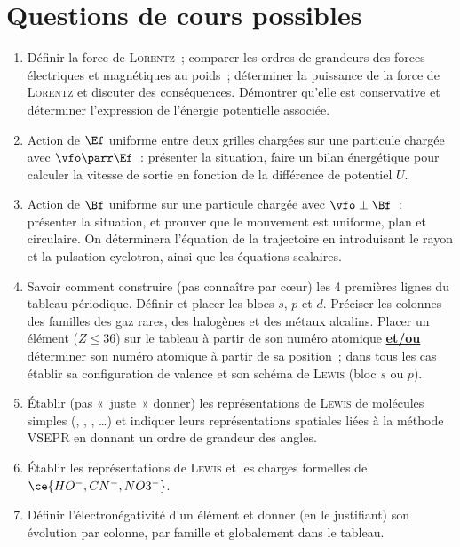 \documentclass[a4paper, 12pt, final, garamond]{book}
\begin{document}
\section{Questions de cours possibles}
\begin{enumerate}[label=\sqenumi]
    \item Définir la force de \textsc{Lorentz}~; comparer les ordres de
        grandeurs des forces électriques et magnétiques au poids~; déterminer la
        puissance de la force de \textsc{Lorentz} et discuter des conséquences.
        Démontrer qu'elle est conservative et déterminer l'expression de
        l'énergie potentielle associée.
    \item Action de $\Ef$ uniforme entre deux grilles chargées sur une particule
        chargée avec $\vfo\parr\Ef$~: présenter la situation, faire un bilan
        énergétique pour calculer la vitesse de sortie en fonction de la
        différence de potentiel $U$.
    \item Action de $\Bf$ uniforme sur une particule chargée avec
        $\vfo\perp\Bf$~: présenter la situation, et prouver que le mouvement est
        uniforme, plan et circulaire. On déterminera l'équation de la
        trajectoire en introduisant le rayon et la pulsation cyclotron, ainsi
        que les équations scalaires.
    \item Savoir comment construire (pas connaître par cœur) les 4 premières
        lignes du tableau périodique. Définir et placer les blocs $s$, $p$ et
        $d$. Préciser les colonnes des familles des gaz rares, des halogènes et
        des métaux alcalins. Placer un élément ($Z \leq 36$) sur le tableau à
        partir de son numéro atomique \textbf{\ul{et/ou}} déterminer son numéro
        atomique à partir de sa position~; dans tous les cas établir sa
        configuration de valence et son schéma de \textsc{Lewis} (bloc $s$ ou
        $p$).
    \item Établir (pas «~juste~» donner) les représentations de \textsc{Lewis}
        de molécules simples (, , , …) et
        indiquer leurs représentations spatiales liées à la méthode VSEPR en
        donnant un ordre de grandeur des angles.
    \item Établir les représentations de \textsc{Lewis} et les charges formelles
        de $\ce{HO^-, CN^-, NO3^-}$.
    \item Définir l'électronégativité d'un élément et donner (en le justifiant)
        son évolution par colonne, par famille et globalement dans le tableau.

\end{enumerate}
\end{document}
